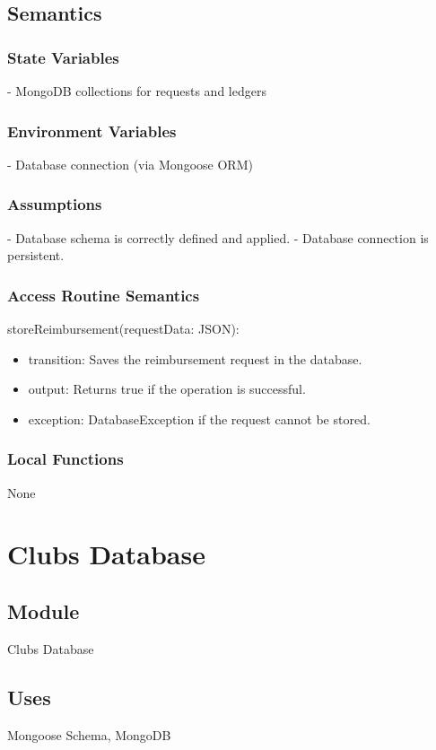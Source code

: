 \documentclass[12pt, titlepage]{article}
\begin{document}
\subsection{Semantics}

\subsubsection{State Variables}
- MongoDB collections for requests and ledgers

\subsubsection{Environment Variables}
- Database connection (via Mongoose ORM)

\subsubsection{Assumptions}
- Database schema is correctly defined and applied.
- Database connection is persistent.

\subsubsection{Access Routine Semantics}
\noindent storeReimbursement(requestData: JSON):
\begin{itemize}
\item transition: Saves the reimbursement request in the database.
\item output: Returns true if the operation is successful.
\item exception: DatabaseException if the request cannot be stored.
\end{itemize}

\subsubsection{Local Functions}
None

\section{Clubs Database} \label{Clubs Database}

\subsection{Module}
Clubs Database

\subsection{Uses}
Mongoose Schema, MongoDB
\end{document}
